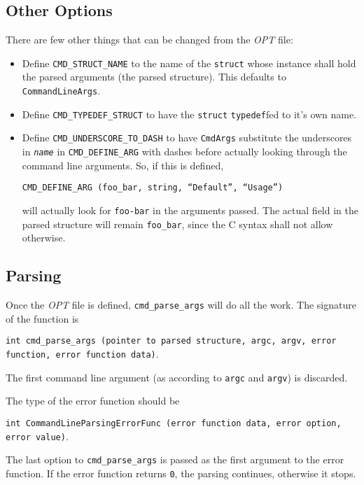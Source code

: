 \documentclass[a4paper,11pt]{article}
\begin{document}
\subsection{Other Options}

There are few other things that can be changed from the \textit{OPT} file:

\begin{itemize}

\item Define \texttt{CMD\_STRUCT\_NAME} to the name of the \texttt{struct} whose instance shall hold the parsed arguments (the parsed structure). This defaults to \texttt{CommandLineArgs}.

\item Define \texttt{CMD\_TYPEDEF\_STRUCT} to have the \texttt{struct} \texttt{typedef}fed to it's own name.

\item Define \texttt{CMD\_UNDERSCORE\_TO\_DASH} to have \texttt{CmdArgs} substitute the underscores in \texttt{\textit{name}} in \texttt{CMD\_DEFINE\_ARG} with dashes before actually looking through the command line arguments. So, if this is defined,

\texttt{CMD\_DEFINE\_ARG (foo\_bar, string, ``Default'', ``Usage'')}

will actually look for \texttt{foo-bar} in the arguments passed. The actual field in the parsed structure will remain \texttt{foo\_bar}, since the C syntax shall not allow otherwise.

\end{itemize}

\subsection{Parsing}

Once the \textit{OPT} file is defined, \texttt{cmd\_parse\_args} will do all the work. The signature of the function is 

\texttt{int cmd\_parse\_args (pointer to parsed structure, argc, argv, error function, error function data)}.

The first command line argument (as according to \texttt{argc} and \texttt{argv}) is discarded.

The type of the error function should be  

\texttt{int CommandLineParsingErrorFunc (error function data, error option, error value)}.

The last option to \texttt{cmd\_parse\_args} is passed as the first argument to the error function. If the error function returns \texttt{0}, the parsing continues, otherwise it stops.
\end{document}
